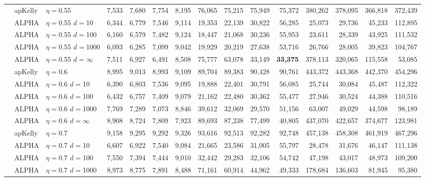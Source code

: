 \documentclass[12pt,runningheads]{llncs}
\begin{document}
{\begin{table}
\begin{tabular}{lll|rrrr|rrrr|rrrr}
\cline{2-15} & apKelly & $\eta=$0.55 & 7,533  & 7,680  & 7,754  & 8,195  & 76,065  & 75,215  & 75,949  & 75,372  & 380,262  & 378,095  & 366,818  & 372,439  \\
& ALPHA & $\eta=$0.55 $d=$10 & 6,344  & 6,779  & 7,546  & 9,114  & 19,353  & 22,139  & 30,822  & 56,285  & 25,073  & 29,736  & 45,233  & 112,895  \\
& ALPHA & $\eta=$0.55 $d=$100 & 6,160  & 6,579  & 7,482  & 9,124  & 18,447  & 21,068  & 30,236  & 55,953  & 23,611  & 28,339  & 43,925  & 111,532  \\
& ALPHA & $\eta=$0.55 $d=$1000 & 6,093  & 6,285  & 7,099  & 9,042  & 19,929  & 20,219  & 27,638  & 53,716  & 26,766  & 28,005  & 39,823  & 104,767  \\
 & ALPHA & $\eta=$0.55 $d=\infty$ & 7,511  & 6,927  & 6,491  & 8,508  & 75,777  & 63,078  & 33,149  & \bf{33,375}  & 378,113  & 320,065  & 115,558  & 53,085  \\
\cline{2-15} & apKelly & $\eta=$0.6 & 8,995  & 9,013  & 8,993  & 9,109  & 89,704  & 89,383  & 90,428  & 90,761  & 443,372  & 443,368  & 442,370  & 454,296  \\
& ALPHA & $\eta=$0.6 $d=$10 & 6,390  & 6,803  & 7,536  & 9,095  & 19,888  & 22,401  & 30,791  & 56,085  & 25,744  & 30,084  & 45,487  & 112,322  \\
& ALPHA & $\eta=$0.6 $d=$100 & 6,432  & 6,757  & 7,409  & 9,079  & 21,162  & 22,480  & 30,362  & 55,477  & 27,946  & 30,524  & 44,388  & 110,516  \\
& ALPHA & $\eta=$0.6 $d=$1000 & 7,769  & 7,289  & 7,073  & 8,846  & 39,612  & 32,069  & 29,570  & 51,156  & 63,007  & 49,029  & 44,598  & 98,189  \\
 & ALPHA & $\eta=$0.6 $d=\infty$ & 8,908  & 8,724  & 7,809  & 7,923  & 89,693  & 87,238  & 77,499  & 40,805  & 437,070  & 422,657  & 374,677  & 123,981  \\
\cline{2-15} & apKelly & $\eta=$0.7 & 9,158  & 9,295  & 9,292  & 9,326  & 93,616  & 92,513  & 92,282  & 92,748  & 457,138  & 458,308  & 461,919  & 467,296  \\
& ALPHA & $\eta=$0.7 $d=$10 & 6,607  & 6,922  & 7,540  & 9,084  & 21,665  & 23,586  & 31,005  & 55,797  & 28,478  & 31,676  & 46,147  & 111,138  \\
& ALPHA & $\eta=$0.7 $d=$100 & 7,550  & 7,394  & 7,444  & 9,010  & 32,442  & 29,283  & 32,106  & 54,742  & 47,198  & 43,017  & 48,973  & 109,200  \\
& ALPHA & $\eta=$0.7 $d=$1000 & 8,973  & 8,775  & 7,891  & 8,488  & 71,161  & 60,914  & 44,962  & 49,333  & 178,684  & 136,603  & 81,945  & 95,380  \\

\end{tabular}
\end{table}}
\end{document}
